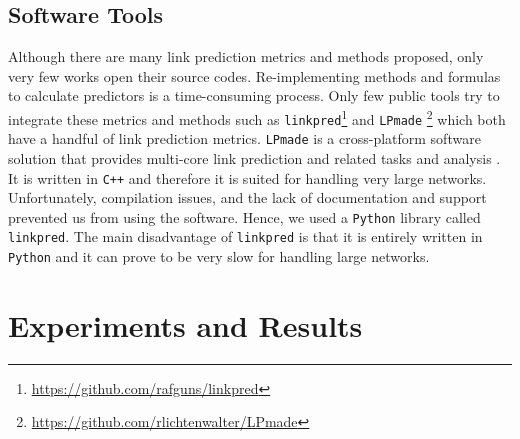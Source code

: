 \documentclass{acm_proc_article-sp}
\begin{document}
\subsection{Software Tools}
Although there are many link prediction metrics and methods proposed, only very few works open their source codes. Re-implementing methods and formulas to calculate predictors is a time-consuming process. Only few public tools try to integrate these metrics and methods such as \texttt{linkpred}\footnote{\url{https://github.com/rafguns/linkpred}} and \texttt{LPmade} \footnote{\url{https://github.com/rlichtenwalter/LPmade}} \cite{lichtenwalter2011lpmade} which both have a handful of link prediction metrics. \texttt{LPmade} is a cross-platform software solution that provides multi-core link prediction and related tasks and analysis \cite{lichtenwalter2011lpmade}. It is written in \texttt{C++} and therefore it is suited for handling very large networks. Unfortunately, compilation issues, and the lack of documentation and support prevented us from using the software. Hence, we used a \texttt{Python} library called \texttt{linkpred}. The main disadvantage of \texttt{linkpred} is that it is entirely written in \texttt{Python} and it can prove to be very slow for handling large networks.

\section{Experiments and Results}
\label{Sect.6}
\end{document}
